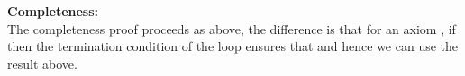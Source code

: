 \begin{theorem}

\noindent
\textbf{Completeness:}\\
The completeness proof proceeds as above, the difference is that for an axiom , if  then the termination condition of the loop ensures that  and hence we can use the result above.\\
\QED
\end{theorem}

